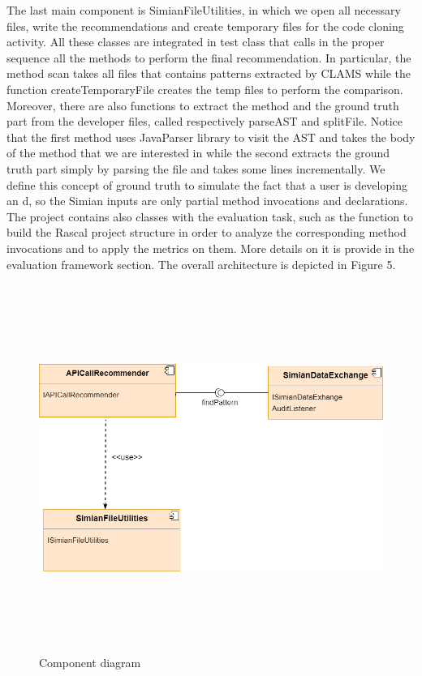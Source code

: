 The last main component is SimianFileUtilities, in which we open all necessary files, write the recommendations and create temporary files for the code cloning activity. All these classes are integrated in test class that calls in the proper sequence all the methods to perform the final recommendation. In particular, the method scan takes all files that contains patterns extracted by CLAMS while the function createTemporaryFile creates the temp files to perform the comparison. Moreover, there are also functions to extract the method and the ground truth part from the developer files, called respectively parseAST and splitFile. Notice that the first method uses JavaParser library to visit the AST and takes the body of the method that we are interested in while the second extracts the ground truth part simply by parsing the file and takes some lines incrementally. We define this concept of ground truth to simulate the fact that a user is developing an d, so the Simian inputs are only partial method invocations and declarations. 
The project contains also classes with the evaluation task, such as the function to build the Rascal project structure in order to analyze the corresponding method invocations and to apply the metrics on them. More details on it is provide in the evaluation framework section. 
The overall architecture is depicted in Figure 5.
\begin{figure}[H]
\includegraphics[width=12cm,height=12cm,keepaspectratio]{images/Component.png}
\centering
\caption{Component diagram}
\label{fig:cmd}
\end{figure}

